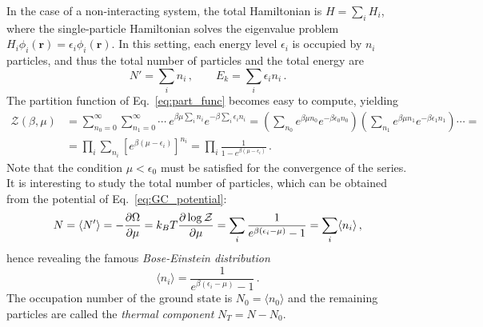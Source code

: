 In the case of a non-interacting system, the total Hamiltonian is $H = \sum_i H_i$, where the single-particle Hamiltonian solves the eigenvalue problem $H_i \phi_i(\mathbf{r}) = \epsilon_i \phi_i(\mathbf{r})$. In this setting, each energy level $\epsilon_i$ is occupied by $n_i$ particles, and thus the total number of particles and the total energy are
\begin{equation*}
    N' = \sum_i n_i\, , \qquad E_k = \sum_i \epsilon_i n_i\, .
\end{equation*}
The partition function of Eq.\ \eqref{eq:part_func} becomes easy to compute, yielding
\begin{equation*}
    \begin{split}
        \mathcal{Z}(\beta, \mu) &= 
        \sum_{n_0 = 0}^\infty \sum_{n_1 = 0}^\infty \cdots\ e^{\beta \mu \sum_i n_i} e^{-\beta \sum_i \epsilon_i n_i} = 
        \left(\sum_{n_0} e^{\beta \mu n_0} e^{-\beta \epsilon_0 n_0}\right)
        \left(\sum_{n_1} e^{\beta \mu n_1} e^{-\beta \epsilon_1 n_1}\right) \cdots = \\
        &= \prod_i \sum_{n_i} \left[e^{\beta(\mu -\epsilon_i)}\right]^{n_i} = 
        \prod_i \frac{1}{1-e^{\beta(\mu - \epsilon_i)}}\, .
    \end{split}
\end{equation*}
Note that the condition $\mu < \epsilon_0$ must be satisfied for the convergence of the series. 
It is interesting to study the total number of particles, which can be obtained from the potential of Eq.\ \eqref{eq:GC_potential}:
\begin{equation*}
    N = \langle N' \rangle = -\pdv{\Omega}{\mu} = k_B T \pdv{\log\mathcal{Z}}{\mu} = \sum_i \frac{1}{e^{\beta(\epsilon_i - \mu)}-1} = \sum_i \langle n_i \rangle\, ,
\end{equation*}
hence revealing the famous \emph{Bose-Einstein distribution}
\begin{equation*}
    \langle n_i \rangle = \frac{1}{e^{\beta(\epsilon_i - \mu)}-1}\, .
\end{equation*}
The occupation number of the ground state is $N_0 = \langle n_0 \rangle$ and the remaining particles are called the \emph{thermal component} $N_T = N - N_0$. 


